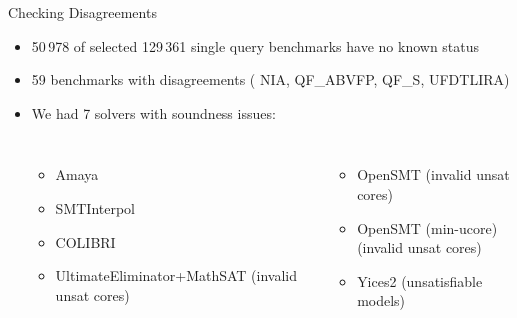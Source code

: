\documentclass[table]{beamer}
\newcommand\vitem{\vfill\item}
\begin{document}
\begin{frame}{Checking Disagreements}

  \begin{itemize}
  \item 50\,978 of selected 129\,361 single query benchmarks have no known status

  \vitem 59 benchmarks with disagreements (%
  NIA,
  QF\_ABVFP,
  QF\_S,
  UFDTLIRA)

  \vitem We had 7 solvers with soundness issues:
  \begin{columns}
    \begin{itemize}
      \item Amaya
      \item SMTInterpol
      \item COLIBRI
      \item UltimateEliminator+MathSAT (invalid unsat cores)
    \end{itemize}
    \begin{itemize}
    \item OpenSMT (invalid unsat cores)
    \item OpenSMT (min-ucore) \\ (invalid unsat cores)
    \item Yices2 (unsatisfiable models)
    \end{itemize}
\end{columns}

  \end{itemize}
  \end{frame}


\end{document}

